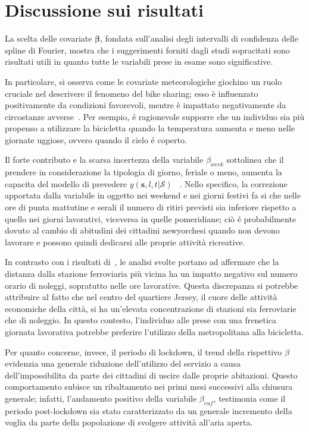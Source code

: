 \section[Discussione sui risultati]{Discussione sui risultati}
La scelta delle covariate $\boldsymbol{\beta}$, fondata sull'analisi degli intervalli di confidenza delle spline di Fourier, mostra che i suggerimenti forniti dagli studi sopracitati sono risultati utili in quanto tutte le variabili prese in esame sono significative. \par In particolare, si osserva come le covariate meteorologiche giochino un ruolo cruciale nel descrivere il fenomeno del bike sharing; esso è influenzato positivamente da condizioni favorevoli, mentre è impattato negativamente da circostanze avverse~\citep{paper_bike_sharing_e_meteo}. Per esempio, é ragionevole supporre che un individuo sia più propenso a utilizzare la bicicletta quando la temperatura aumenta e meno nelle giornate uggiose, ovvero quando il cielo é coperto.
\par Il forte contributo e la scarsa incertezza della variabile $\beta_{week}$ sottolinea che il prendere in considerazione la tipologia di giorno, feriale o meno, aumenta la capacita del modello di prevedere $y(\mathbf{s}, l, t| \mathcal{S})$ ~\citep{paper_bike_sharing_Otto}. Nello specifico, la correzione apportata dalla variabile in oggetto nei weekend e nei giorni festivi fa si che nelle ore di punta mattutine e serali il numero di ritiri previsti sia inferiore rispetto a quello nei giorni lavorativi, viceversa in quelle pomeridiane; ciò é probabilmente dovuto al cambio di abitudini dei cittadini newyorchesi quando non devono lavorare e possono quindi dedicarsi alle proprie attività ricreative.
\par In contrasto con i risultati di~\cite{paper_bike_sharing_e_meteo}, le analisi svolte portano ad affermare che la distanza dalla stazione ferroviaria più vicina ha un impatto negativo sul numero orario di noleggi, sopratutto nelle ore lavorative. Questa discrepanza si potrebbe attribuire al fatto che nel centro del quartiere Jersey, il cuore delle attività economiche della città, si ha un'elevata concentrazione di stazioni sia ferroviarie che di noleggio. In questo contesto, l'individuo alle prese con una frenetica giornata lavorativa potrebbe preferire l'utilizzo della metropolitana alla bicicletta.
\par Per quanto concerne, invece, il periodo di lockdown, il trend della rispettivo $\beta$ evidenzia una generale riduzione dell'utilizzo del servizio a causa dell'impossibilita da parte dei cittadini di uscire dalle proprie abitazioni. Questo comportamento subisce un ribaltamento nei primi mesi successivi alla chiusura generale; infatti, l'andamento positivo della variabile $\beta_{euf}$, testimonia come il periodo post-lockdown sia stato caratterizzato da un generale incremento della voglia da parte della popolazione di svolgere attività all'aria aperta.
